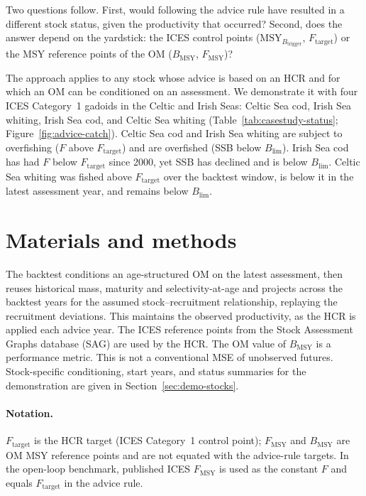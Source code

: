 \documentclass[11pt,a4paper]{article}
\newcommand{\Fmsy}{F_{\mathrm{MSY}}}
\newcommand{\Blim}{B_{\lim}}
\newcommand{\Btrig}{\mathrm{MSY}_{B_{\mathrm{trigger}}}}
\newcommand{\Bmsy}{B_{\mathrm{MSY}}}
\newcommand{\Ftar}{F_{\mathrm{target}}}
\begin{document}
Two questions follow. First, would following the advice rule have
resulted in a different stock status, given the productivity that
occurred? Second, does the answer depend on the yardstick: the ICES
control points ($\Btrig$, $\Ftar$) or the MSY reference points of the OM
($\Bmsy$, $\Fmsy$)?

The approach applies to any stock whose advice is based on an HCR and
for which an OM can be conditioned on an assessment. We demonstrate it
with four ICES Category~1 gadoids in the Celtic and Irish Seas: Celtic
Sea cod, Irish Sea whiting, Irish Sea cod, and Celtic Sea whiting
(Table~\ref{tab:casestudy-status}; Figure~\ref{fig:advice-catch}).
Celtic Sea cod and Irish Sea whiting are subject to overfishing ($F$
above $\Ftar$) and are overfished (SSB below $\Blim$). Irish Sea cod has
had $F$ below $\Ftar$ since 2000, yet SSB has declined and is below
$\Blim$. Celtic Sea whiting was fished above $\Ftar$ over the backtest
window, is below it in the latest assessment year, and remains below
$\Blim$.

\section{Materials and methods}
\label{sec:methods}

The backtest conditions an age-structured OM on the latest assessment, then reuses historical mass, maturity and selectivity-at-age and projects across the backtest years for the assumed stock--recruitment relationship, replaying the recruitment deviations. This maintains the observed productivity, as the HCR is applied each advice year. The ICES reference points from the Stock Assessment Graphs database
(SAG) are used by the HCR. The OM value of $\Bmsy$ is a performance metric. This is not a conventional MSE of unobserved futures. Stock-specific conditioning, start years, and status summaries for the demonstration are given in Section~\ref{sec:demo-stocks}.

\paragraph{Notation.} $\Ftar$ is the HCR target (ICES Category~1
control point); $\Fmsy$ and $\Bmsy$ are OM MSY reference points and are
not equated with the advice-rule targets. In the open-loop benchmark,
published ICES $F_{\mathrm{MSY}}$ is used as the constant $F$ and equals
$\Ftar$ in the advice rule.
\end{document}
